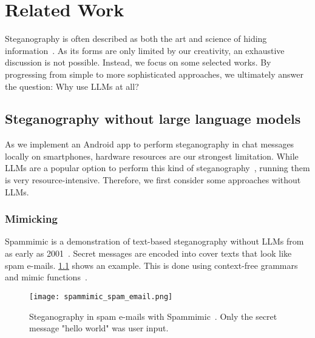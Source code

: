 
\chapter{Related Work}\label{ch:relatedwork}
\glsresetall %

Steganography is often described as both the art and science of hiding information~\cite{bennettLinguisticSteganographySurvey2004}. As its forms are only limited by our creativity, an exhaustive discussion is not possible. Instead, we focus on some selected works. By progressing from simple to more sophisticated approaches, we ultimately answer the question: Why use \glspl{LLM} at all?

\section{Steganography without large language models}
\label{sec:steganographyWithoutLLMs}
As we implement an Android app to perform steganography in chat messages locally on smartphones, hardware resources are our strongest limitation. While \glspl{LLM} are a popular option to perform this kind of steganography~\cite{zieglerNeuralLinguisticSteganography2019}, running them is very resource-intensive. Therefore, we first consider some approaches without \glspl{LLM}.

\subsection{Mimicking}
\label{sec:mimicking}
Spammimic is a demonstration of text-based steganography without \glspl{LLM} from as early as 2001~\cite{spammimicSpammimic2000}. Secret messages are encoded into cover texts that look like spam e-mails. \cref{fig:spammimicSpamEmail} shows an example. This is done using context-free grammars and mimic functions~\cite{waynerMimicFunctions1992,bennettLinguisticSteganographySurvey2004}.

\begin{figure}
    \begin{wide}
        \centering
        \captionsetup{width=\linewidth}
        \texttt{[image: spammimic\_spam\_email.png]}
        \caption[Spammimic]{Steganography in spam e-mails with Spammimic~\cite{spammimicSpammimic2000}. Only the secret message "hello world" was user input.}
        \label{fig:spammimicSpamEmail}
    \end{wide}
\end{figure}

